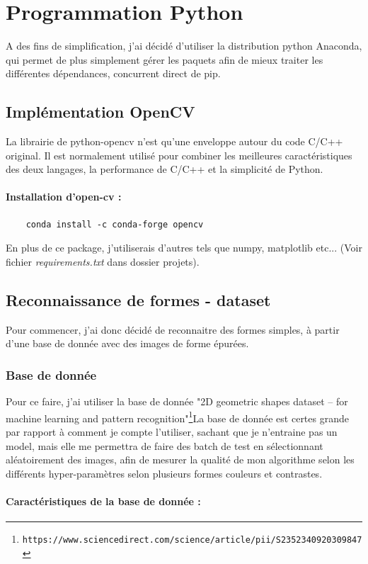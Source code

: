 \clearpage
\section{Programmation Python}
A des fins de simplification, j'ai décidé d'utiliser la distribution python Anaconda, qui permet de plus simplement gérer les paquets afin de mieux traiter les différentes dépendances, concurrent direct de pip.

\subsection{Implémentation OpenCV}
La librairie de python-opencv n'est qu'une enveloppe autour du code C/C++ original. Il est normalement utilisé pour combiner les meilleures caractéristiques des deux langages, la performance de C/C++ et la simplicité de Python.

\paragraph{Installation d'open-cv :}
\begin{verbatim}
	conda install -c conda-forge opencv
\end{verbatim}
En plus de ce package, j'utiliserais d'autres tels que numpy, matplotlib etc... (Voir fichier \textit{requirements.txt} dans dossier projets).

\subsection{Reconnaissance de formes - dataset}
	Pour commencer, j'ai donc décidé de reconnaitre des formes simples, à partir d'une base de donnée avec des images de forme épurées.
	\subsubsection{Base de donnée}
	Pour ce faire, j'ai utiliser la base de donnée "2D geometric shapes dataset – for machine learning and pattern recognition"\footnote{\verb|https://www.sciencedirect.com/science/article/pii/S2352340920309847|}La base de donnée est certes grande par rapport à comment je compte l'utiliser, sachant que je n'entraine pas un model, mais elle me permettra de faire des batch de test en sélectionnant aléatoirement des images, afin de mesurer la qualité de mon algorithme selon les différents hyper-paramètres selon plusieurs formes couleurs et contrastes.
	
	\paragraph{Caractéristiques de la base de donnée :}
	
